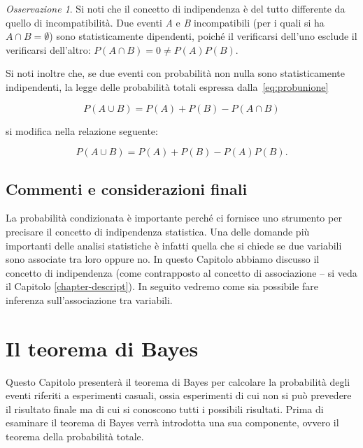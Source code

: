 \documentclass[
  11pt,
]{krantz}
\theoremstyle{definition}
\theoremstyle{definition}
\theoremstyle{definition}
\theoremstyle{definition}
\theoremstyle{remark}
\newtheorem*{remark}{Osservazione}
\begin{document}
\begin{remark}
Si noti che il concetto di indipendenza è del tutto differente da quello di incompatibilità. Due eventi \emph{A} e \emph{B} incompatibili (per i quali si ha \(A \cap B = \emptyset\)) sono statisticamente dipendenti, poiché il verificarsi dell'uno esclude il verificarsi dell'altro: \(P(A \cap B)=0 \neq P(A)P(B)\).
\end{remark}

Si noti inoltre che, se due eventi con probabilità non nulla sono statisticamente indipendenti, la legge delle probabilità totali espressa dalla~\eqref{eq:probunione}

\begin{equation}
P(A \cup B) = P(A) + P(B) - P(A \cap B)
\label{eq:probunione}
\end{equation}

si modifica nella relazione seguente:

\begin{equation}
P(A \cup B) = P(A) + P(B) - P(A)P(B).
\end{equation}

\hypertarget{commenti-e-considerazioni-finali-1}{%
\section*{Commenti e considerazioni finali}\label{commenti-e-considerazioni-finali-1}}


La probabilità condizionata è importante perché ci fornisce uno strumento per precisare il concetto di indipendenza statistica. Una delle domande più importanti delle analisi statistiche è infatti quella che si chiede se due variabili sono associate tra loro oppure no. In questo Capitolo abbiamo discusso il concetto di indipendenza (come contrapposto al concetto di associazione -- si veda il Capitolo \ref{chapter-descript}). In seguito vedremo come sia possibile fare inferenza sull'associazione tra variabili.

\hypertarget{chapter-teo-bayes}{%
\chapter{Il teorema di Bayes}\label{chapter-teo-bayes}}

Questo Capitolo presenterà il teorema di Bayes per calcolare la probabilità degli eventi riferiti a esperimenti casuali, ossia esperimenti di cui non si può prevedere il risultato finale ma di cui si conoscono tutti i possibili risultati. Prima di esaminare il teorema di Bayes verrà introdotta una sua componente, ovvero il teorema della probabilità totale.
\end{document}
